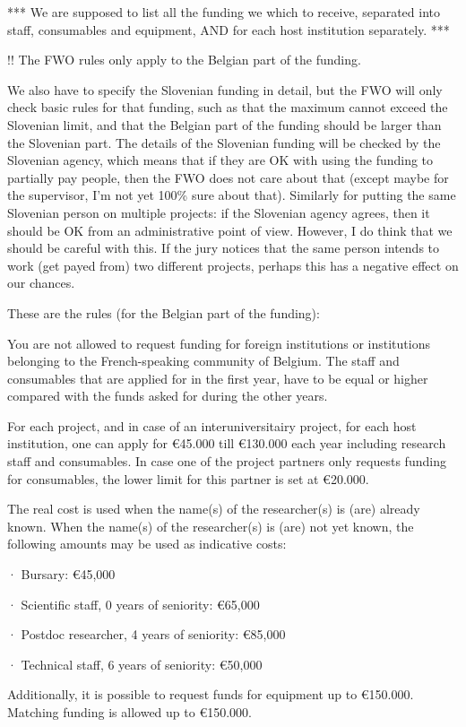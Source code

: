 \documentclass[11pt,dvipsnames,usenames,a4paper]{article}
\begin{document}
*** We are supposed to list all the funding we which to receive, separated into staff, consumables and equipment, AND for each host institution separately. ***

!! The FWO rules only apply to the Belgian part of the funding.

We also have to specify the Slovenian funding in detail, but the FWO will only check basic rules for that funding, such as that the maximum cannot exceed the Slovenian limit, and that the Belgian part of the funding should be larger than the Slovenian part. The details of the Slovenian funding will be checked by the Slovenian agency, which means that if they are OK with using the funding to partially pay people, then the FWO does not care about that (except maybe for the supervisor, I'm not yet 100\% sure about that). Similarly for putting the same Slovenian person on multiple projects: if the Slovenian agency agrees, then it should be OK from an administrative point of view. However, I do think that we should be careful with this. If the jury notices that the same person intends to work (get payed from) two different projects, perhaps this has a negative effect on our chances.

{\color{Gray}These are the rules (for the Belgian part of the funding):

You are not allowed to request funding for foreign institutions or institutions belonging to the French-speaking community of Belgium. The staff and consumables that are applied for in the first year, have to be equal or higher compared with the funds asked for during the other years. 

For each project, and in case of an interuniversitairy project, for each host institution, one can apply for €45.000 till €130.000 each year including research staff and consumables. In case one of the project partners only requests funding for consumables, the lower limit for this partner is set at €20.000. 

The real cost is used when the name(s) of the researcher(s) is (are) already known. When the name(s) of the researcher(s) is (are) not yet known, the following amounts may be used as indicative costs:

·         Bursary: €45,000

·         Scientific staff, 0 years of seniority: €65,000

·         Postdoc researcher, 4 years of seniority: €85,000

·         Technical staff, 6 years of seniority: €50,000


Additionally, it is possible to request funds for equipment up to €150.000. Matching funding is allowed up to €150.000.
}
\end{document}
